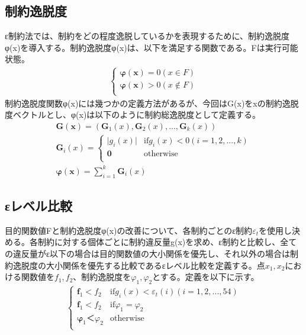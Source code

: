 \documentclass[twocolumn,10pt]{jarticle}
\begin{document}
\subsection{制約逸脱度}
ε制約法では、制約をどの程度逸脱しているかを表現するために、制約逸脱度φ(x)を導入する。制約逸脱度φ(x)は、以下を満足する関数である。Fは実行可能状態。
\begin{eqnarray}
\left\{
\begin{array}{cc}
    \bm{φ(x)}=0(x\in{F})\\
    \bm{φ(x)}>0(x\notin{F})\\
\end{array}
\right.
\end{eqnarray}
制約逸脱度関数φ(x)には幾つかの定義方法があるが、今回はG(x)をxの制約逸脱度ベクトルとし、φ(x)は以下のように制約総逸脱度として定義する。
\begin{eqnarray}
\bm{G(x)}=(\bm{G}_1(x),\bm{G}_2(x),...,\bm{G}_k(x))\\   
\bm{G}_i(x)=
\left\{
\begin{array}{cc}
     \bm|{g}_i(x)| & \mbox{if${g}_i(x)<0(i=1,2,...,k)$} \\
    \bm{0} & \mbox{otherwise}\\
\end{array}
\right.\\
\bm{φ(x)}=\sum_{i=1}^k \bm{G}_i(x)
\end{eqnarray}

\subsection{εレベル比較}
目的関数値Fと制約逸脱度φ(x)の改善について、各制約ごとのε制約${ε}_t$を使用し決める。各制約に対する個体ごとに制約違反量g(x)を求め、ε制約と比較し、全ての違反量がε以下の場合は目的関数値の大小関係を優先し、それ以外の場合は制約逸脱度の大小関係を優先する比較であるεレベル比較を定義する。点${x}_1,{x}_2$における関数値を${f}_1,{f}_2$、制約逸脱度を${φ}_1,{φ}_2$とする。定義を以下に示す。
\begin{eqnarray}
\left\{
\begin{array}{cc}
    \bm{f}_1<{f}_2 & \mbox{if${g}_i(x)<{ε}_t(i)(i=1,2,...,54)$}\\
    \bm{f}_1<{f}_2 & \mbox{if${φ}_1={φ}_2$}\\
    \bm{φ}_1＜{φ}_2 & \mbox{otherwise}\\
\end{array}
\right.
\end{eqnarray}
\end{document}
